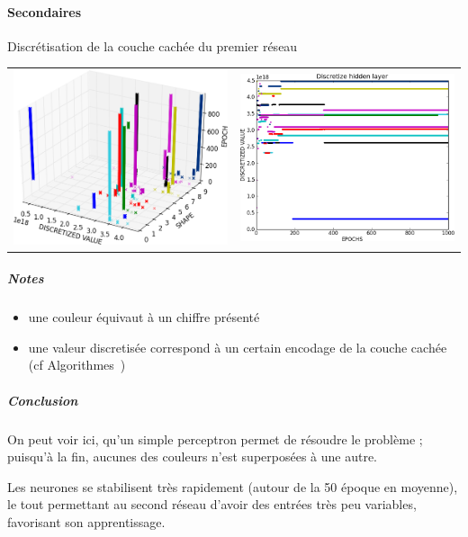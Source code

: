     \paragraph{Secondaires}
      Discrétisation de la couche cachée du premier réseau
      \begin{center}
	\begin{tabular}{lr}
	  \hspace*{-1cm}
	  \includegraphics[width=250px]{data/expA2/discretize_cloud.png}
	  &
	  \includegraphics[width=250px]{data/expA2/discretize.png} 
	\end{tabular}
      \end{center} 
      \subparagraph{Notes}
	\begin{itemize}
	  \item une couleur équivaut à un chiffre présenté
	  \item une valeur discretisée correspond à un certain encodage de la couche cachée (cf Algorithmes~)
	\end{itemize}
      \subparagraph{Conclusion}
	On peut voir ici, qu'un simple perceptron permet de résoudre le problème ; puisqu'à la fin,
        aucunes des couleurs n'est superposées à une autre.
      
	Les neurones se stabilisent très rapidement (autour de la 50 époque en moyenne), 
	le tout permettant au second réseau d'avoir des entrées très peu variables, favorisant
	son apprentissage.
